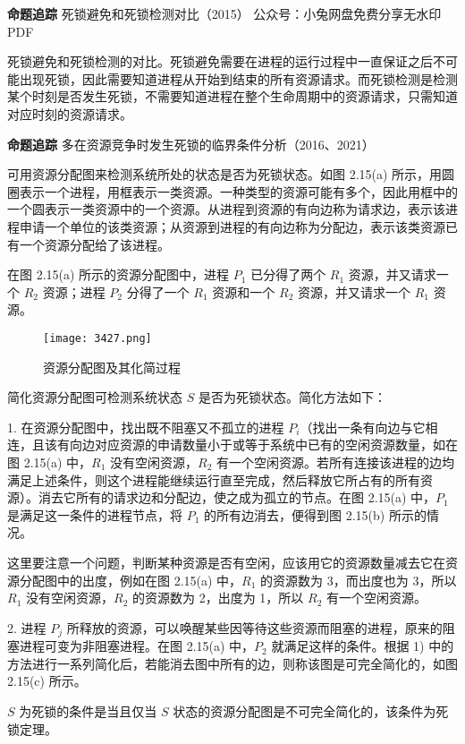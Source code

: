 \documentclass{ctexbook}
\begin{document}
		\textbf{命题追踪} 死锁避免和死锁检测对比（2015） 公众号：小兔网盘免费分享无水印PDF
		
		死锁避免和死锁检测的对比。死锁避免需要在进程的运行过程中一直保证之后不可能出现死锁，因此需要知道进程从开始到结束的所有资源请求。而死锁检测是检测某个时刻是否发生死锁，不需要知道进程在整个生命周期中的资源请求，只需知道对应时刻的资源请求。
		
		\textbf{命题追踪} 多在资源竞争时发生死锁的临界条件分析（2016、2021）
		
		可用资源分配图来检测系统所处的状态是否为死锁状态。如图 2.15(a) 所示，用圆圈表示一个进程，用框表示一类资源。一种类型的资源可能有多个，因此用框中的一个圆表示一类资源中的一个资源。从进程到资源的有向边称为请求边，表示该进程申请一个单位的该类资源；从资源到进程的有向边称为分配边，表示该类资源已有一个资源分配给了该进程。
		
		在图 2.15(a) 所示的资源分配图中，进程 $P_1$ 已分得了两个 $R_1$ 资源，并又请求一个 $R_2$ 资源；进程 $P_2$ 分得了一个 $R_1$ 资源和一个 $R_2$ 资源，并又请求一个 $R_1$ 资源。
		
		\begin{figure}[h]
			\centering
			\texttt{[image: 3427.png]}
			\caption{资源分配图及其化简过程}
			\label{fig:resource_allocation_graph}
		\end{figure}
		
		简化资源分配图可检测系统状态 $S$ 是否为死锁状态。简化方法如下：
		
		1. 在资源分配图中，找出既不阻塞又不孤立的进程 $P_i$（找出一条有向边与它相连，且该有向边对应资源的申请数量小于或等于系统中已有的空闲资源数量，如在图 2.15(a) 中，$R_1$ 没有空闲资源，$R_2$ 有一个空闲资源。若所有连接该进程的边均满足上述条件，则这个进程能继续运行直至完成，然后释放它所占有的所有资源）。消去它所有的请求边和分配边，使之成为孤立的节点。在图 2.15(a) 中，$P_1$ 是满足这一条件的进程节点，将 $P_1$ 的所有边消去，便得到图 2.15(b) 所示的情况。
		
		这里要注意一个问题，判断某种资源是否有空闲，应该用它的资源数量减去它在资源分配图中的出度，例如在图 2.15(a) 中，$R_1$ 的资源数为 3，而出度也为 3，所以 $R_1$ 没有空闲资源，$R_2$ 的资源数为 2，出度为 1，所以 $R_2$ 有一个空闲资源。
		
		2. 进程 $P_j$ 所释放的资源，可以唤醒某些因等待这些资源而阻塞的进程，原来的阻塞进程可变为非阻塞进程。在图 2.15(a) 中，$P_2$ 就满足这样的条件。根据 1) 中的方法进行一系列简化后，若能消去图中所有的边，则称该图是可完全简化的，如图 2.15(c) 所示。
		
		$S$ 为死锁的条件是当且仅当 $S$ 状态的资源分配图是不可完全简化的，该条件为死锁定理。
		
\end{document}
